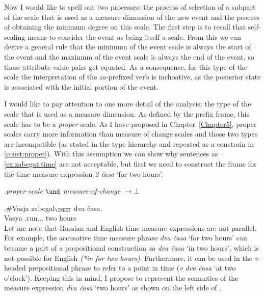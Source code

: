 Now I would like to spell out two processes: the process of selection of a subpart of the scale that is used as a measure dimension of the new event and the process of obtaining the minimum degree on this scale. The first step is to recall that self-scaling means to consider the event as being itself a scale. From this we can derive a general rule that the minimum of the event scale is always the start of the event and the maximum of the event scale is always the end of the event, so those attribute-value pairs get equated. As a consequence, for this type of the scale the interpretation of the \textit{za-}prefixed verb is inchoative, as the posterior state is associated with the initial portion of the event.

I would like to pay attention to one more detail of the analysis: the type of the scale that is used as a measure dimension. As defined by the prefix frame, this scale has to be a \textit{proper} scale. As I have proposed in Chapter~\ref{Chapter5}, proper scales carry more information than measure of change scales and those two types are incompatible (as stated in the type hierarchy and repeated as a constrain in \ref{const:proper}). With this assumption we can show why sentences as \ref{ex:zabegat:time} are not acceptable, but first we need to construct the frame for the time measure expression \textit{2 \v{c}asa} `for two hours'. 

\ex.\label{const:proper}\textit{proper-scale} $\und$ \textit{measure-of-change} $\rightarrow \bot$

\exg.\label{ex:zabegat:time}\#Vasja zabegal$_{\INDET}$ dva \v{c}asa.\\
Vasya .run... two hours\\

Let me note that Russian and English time measure expressions are not parallel. For example, the accusative time measure phrase \textit{dva \v{c}asa} `for two hours' can become a part of a prepositional construction \textit{za dva \v{c}asa} `in two hours', which is not possible for English \textit{(*in for two hours)}. Furthermore, it can be used in the \textit{v-}headed prepositional phrase to refer to a point in time (\textit{v dva \v{c}asa} `at two o'clock'). Keeping this in mind, I propose to represent the semantics of the measure expression \textit{dva \v{c}asa} `two hours' as shown on the left side of . 

